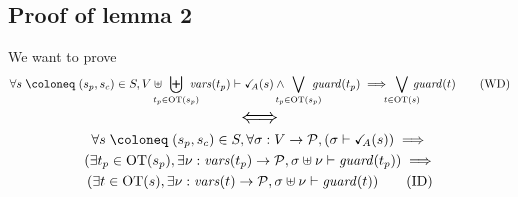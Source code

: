\documentclass{article}
\begin{document}
\subsection{Proof of lemma 2}
We want to prove
\[ \forall s \defobject \mpar{s_p, s_c} \in S, V \uplus \biguplus_\subbox{t_p \in \fOT{s_p}} \fvars{t_p} \vdash \reach{A}\mpar{s} \wedge \bigvee_\subbox{t_p \in \fOT{s_p}} \fguard{t_p} \implies \bigvee_\subbox{t \in \fOT{s}} \fguard{t} \tag{WD}\label{eq:nlcWD} \]
\[ \text{\Large\(\displaystyle \iff\)} \]
\begin{multline*}
	\forall s \defobject \mpar{s_p, s_c} \in S, \forall \sigma: V \to \values, \mpar{\sigma \vdash \reach{A}\mpar{s}} \implies \\
	\mpar{\exists t_p \in \fOT{s_p}, \exists \nu: \fvars{t_p} \to \values, \sigma \uplus \nu \vdash \fguard{t_p}} \implies \\
	\mpar{\exists t \in \fOT{s}, \exists \nu: \fvars{t} \to \values, \sigma \uplus \nu \vdash \fguard{t}} \tag{ID}\label{eq:nlcID}
\end{multline*}
\end{document}
